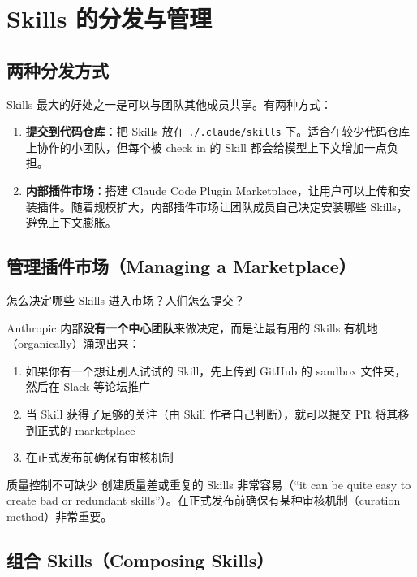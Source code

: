 \documentclass[a4paper]{article}
\begin{document}
\section{Skills 的分发与管理}

\subsection{两种分发方式}

Skills 最大的好处之一是可以与团队其他成员共享。有两种方式：

\begin{enumerate}
    \item \textbf{提交到代码仓库}：把 Skills 放在 \texttt{./.claude/skills} 下。适合在较少代码仓库上协作的小团队，但每个被 check in 的 Skill 都会给模型上下文增加一点负担。
    \item \textbf{内部插件市场}：搭建 Claude Code Plugin Marketplace，让用户可以上传和安装插件。随着规模扩大，内部插件市场让团队成员自己决定安装哪些 Skills，避免上下文膨胀。
\end{enumerate}

\subsection{管理插件市场（Managing a Marketplace）}

怎么决定哪些 Skills 进入市场？人们怎么提交？

Anthropic 内部\textbf{没有一个中心团队}来做决定，而是让最有用的 Skills 有机地（organically）涌现出来：

\begin{enumerate}
    \item 如果你有一个想让别人试试的 Skill，先上传到 GitHub 的 sandbox 文件夹，然后在 Slack 等论坛推广
    \item 当 Skill 获得了足够的关注（由 Skill 作者自己判断），就可以提交 PR 将其移到正式的 marketplace
    \item 在正式发布前确保有审核机制
\end{enumerate}

\begin{warningbox}{质量控制不可缺少}
创建质量差或重复的 Skills 非常容易（``it can be quite easy to create bad or redundant skills''）。在正式发布前确保有某种审核机制（curation method）非常重要。
\end{warningbox}

\subsection{组合 Skills（Composing Skills）}
\end{document}
